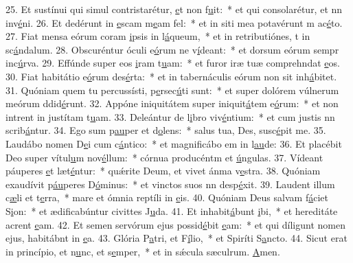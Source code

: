 25. Et sustínui qui simul contristarétur, \uline{e}t non f\uline{u}it:~* et qui consolarétur, et nn inv\uline{é}ni.
26. Et dedérunt in \uline{e}scam m\uline{e}am fel:~* et in siti mea potavérunt m ac\uline{é}to.
27. Fiat mensa eórum coram \uline{i}psis in l\uline{á}queum,~* et in retributiónes, t in sc\uline{á}ndalum.
28. Obscuréntur óculi e\uline{ó}rum ne v\uline{í}deant:~* et dorsum eórum sempr inc\uline{ú}rva.
29. Effúnde super eos \uline{i}ram t\uline{u}am:~* et furor iræ tuæ comprehndat \uline{e}os.
30. Fiat habitátio e\uline{ó}rum des\uline{é}rta:~* et in tabernáculis eórum non sit  inh\uline{á}bitet.
31. Quóniam quem tu percussísti, p\uline{e}rsec\uline{ú}ti sunt:~* et super dolórem vúlnerum meórum ddid\uline{é}runt.
32. Appóne iniquitátem super iniquit\uline{á}tem e\uline{ó}rum:~* et non intrent in justítam t\uline{u}am.
33. Deleántur de l\uline{i}bro viv\uline{é}ntium:~* et cum justis nn scrib\uline{á}ntur.
34. Ego sum p\uline{au}per et d\uline{o}lens:~* salus tua, Des, susc\uline{é}pit me.
35. Laudábo nomen D\uline{e}i cum c\uline{á}ntico:~* et magnificábo em in l\uline{au}de:
36. Et placébit Deo super vítul\uline{u}m nov\uline{é}llum:~* córnua producéntm et \uline{ú}ngulas.
37. Vídeant páuperes \uline{e}t læt\uline{é}ntur:~* quǽrite Deum, et vivet ánma v\uline{e}stra.
38. Quóniam exaudívit p\uline{áu}peres D\uline{ó}minus:~* et vinctos suos nn desp\uline{é}xit.
39. Laudent illum c\uline{æ}li et t\uline{e}rra,~* mare et ómnia reptíli in \uline{e}is.
40. Quóniam Deus salvam f\uline{á}ciet S\uline{i}on:~* et ædificabúntur civittes J\uline{u}da.
41. Et inhabit\uline{á}bunt \uline{i}bi,~* et hereditáte acrent \uline{e}am.
42. Et semen servórum ejus possid\uline{é}bit \uline{e}am:~* et qui díligunt nomen ejus, habitábnt in \uline{e}a.
43. Glória P\uline{a}tri, et F\uline{í}lio,~* et Spiríti S\uline{a}ncto.
44. Sicut erat in princípio, et n\uline{u}nc, et s\uline{e}mper,~* et in sǽcula sæculrum. \uline{A}men.
